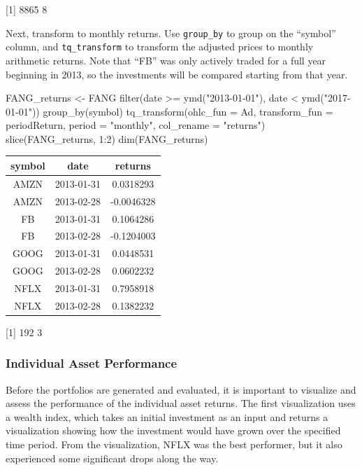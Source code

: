 {[}1{]} 8865 8

\hspace{20 mm}

Next, transform to monthly returns. Use \texttt{group\_by} to group on
the ``symbol'' column, and \texttt{tq\_transform} to transform the
adjusted prices to monthly arithmetic returns. Note that ``FB'' was only
actively traded for a full year beginning in 2013, so the investments
will be compared starting from that year.

\begin{Schunk}
\begin{Sinput}
FANG_returns <- FANG %
    filter(date >= ymd("2013-01-01"),
           date <  ymd("2017-01-01")) %
    group_by(symbol) %
    tq_transform(ohlc_fun = Ad,
                 transform_fun = periodReturn,
                 period = "monthly",
                 col_rename = "returns")
slice(FANG_returns, 1:2)
dim(FANG_returns)
\end{Sinput}
\end{Schunk}

\begin{tabular}{ccc}
\toprule
symbol & date & returns\\
\midrule
AMZN & 2013-01-31 & 0.0318293\\
AMZN & 2013-02-28 & -0.0046328\\
FB & 2013-01-31 & 0.1064286\\
FB & 2013-02-28 & -0.1204003\\
GOOG & 2013-01-31 & 0.0448531\\
\addlinespace
GOOG & 2013-02-28 & 0.0602232\\
NFLX & 2013-01-31 & 0.7958918\\
NFLX & 2013-02-28 & 0.1382232\\
\bottomrule
\end{tabular}

{[}1{]} 192 3

\hspace{20 mm}

\subsubsection{Individual Asset
Performance}\label{individual-asset-performance}

Before the portfolios are generated and evaluated, it is important to
visualize and assess the performance of the individual asset returns.
The first visualization uses a wealth index, which takes an initial
investment as an input and returns a visualization showing how the
investment would have grown over the specified time period. From the
visualization, NFLX was the best performer, but it also experienced some
significant drops along the way.

